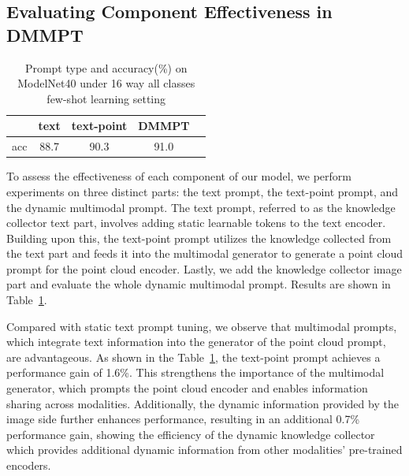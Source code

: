 \documentclass{ecai}
\begin{document}
\subsection{ Evaluating Component Effectiveness in DMMPT}
\begin{table}[ht]
\begin{center}
{\caption{Prompt type and accuracy(\%) on ModelNet40 under 16 way all classes few-shot learning setting}\label{table3}}
\begin{tabular}{lcccc}
\toprule
&\multicolumn{1}{c}{text}&\multicolumn{1}{c}{text-point}&\multicolumn{1}{c}{DMMPT}\\
\midrule
\quad acc&88.7&90.3&91.0\\
\bottomrule
\end{tabular}
\end{center}
\end{table}

To assess the effectiveness of each component of our model, we perform experiments on three distinct parts: the text prompt, the text-point prompt, and the dynamic multimodal prompt. The text prompt, referred to as the knowledge collector text part, involves adding static learnable tokens to the text encoder. Building upon this, the text-point prompt utilizes the knowledge collected from the text part and feeds it into the multimodal generator to generate a point cloud prompt for the point cloud encoder. Lastly, we add the knowledge collector image part and evaluate the whole dynamic multimodal prompt. Results are shown in Table~\ref{table3}.

Compared with static text prompt tuning, we observe that multimodal prompts, which integrate text information into the generator of the point cloud prompt, are advantageous. As shown in the Table~\ref{table3}, the text-point prompt achieves a performance gain of 1.6\%. This strengthens the importance of the multimodal generator, which prompts the point cloud encoder and enables information sharing across modalities. Additionally, the dynamic information provided by the image side further enhances performance, resulting in an additional 0.7\% performance gain, showing the efficiency of the dynamic knowledge collector which provides additional dynamic information from other modalities' pre-trained encoders.
\end{document}
